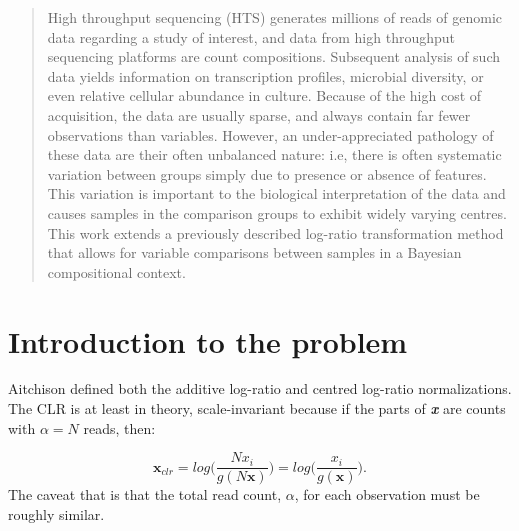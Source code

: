 \documentclass[a0,portrait]{a0poster}
\begin{document}
\begin{multicols}{2} %


\color{Navy} %
\vspace{-1cm}
\begin{abstract}
\large High throughput sequencing (HTS) generates millions of reads of genomic data regarding a study of interest, and data from high throughput sequencing platforms are count compositions. Subsequent analysis of such data yields information on transcription profiles, microbial diversity, or even relative cellular abundance in culture. Because of the high cost of acquisition, the data are usually sparse, and always contain far fewer observations than variables. However, an under-appreciated pathology of these data are their often unbalanced nature: i.e, there is often systematic variation between groups simply due to presence or absence of features. This variation is important to the biological interpretation of the data and causes samples in the comparison groups to exhibit widely varying centres. This work extends a previously described log-ratio transformation method that allows for variable comparisons between samples in a Bayesian compositional context. 

\end{abstract}

\vspace{-1cm}
\color{SaddleBrown} %
\section*{Introduction to the problem}\large
Aitchison \cite{Aitchison:1986} defined both the additive log-ratio and centred log-ratio normalizations. The CLR is at least in theory, scale-invariant because if the parts of \textit{\textbf{x}} are counts with $\alpha=N$ reads, then: 

\begin{equation}
	\textbf{x}_{clr}= log\big( \frac{Nx_i}{g(N\textbf{x})}   \big) =  log\big( \frac{x_i}{g(\textbf{x})}  \big).
\label{eq:equip}
\end{equation}
 The caveat that is that the total read count, $\alpha$, for each observation must be roughly similar. 


\end{multicols}
\end{document}
